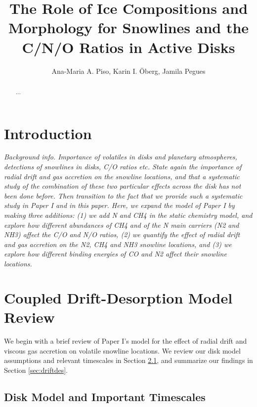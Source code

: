 \documentclass[apj]{emulateapj}
\newcommand{\emgr}[1]{\emph{ \color{gray} #1}}
\begin{document}


\title{The Role of Ice Compositions and Morphology for Snowlines and the C/N/O Ratios in Active Disks}

\author{Ana-Maria A. Piso, Karin I. \"Oberg, Jamila Pegues}


\begin{abstract}
...
\end{abstract}

\section{Introduction}

\emgr{Background info. Importance of volatiles in disks and planetary atmospheres, detections of snowlines in disks, C/O ratios etc. State again the importance of radial drift and gas accretion on the snowline locations, and that a systematic study of the combination of these two particular effects across the disk has not been done before. Then transition to the fact that we provide such a systematic study in Paper I and in this paper. Here, we expand the model of Paper I by making three additions: (1) we add N and CH4 in the static chemistry model, and explore how different abundances of CH4 and of the N main carriers (N2 and NH3) affect the C/O  and N/O ratios, (2) we quantify the effect of radial drift and gas accretion on the N2, CH4 and NH3 snowline locations, and (3) we explore how different binding energies of CO and N2 affect their snowline locations.}

\section{Coupled Drift-Desorption Model Review}

We begin with a brief review of Paper I's model for the effect of radial drift and viscous gas accretion on volatile snowline locations. We review our disk model assumptions and relevant timescales in Section \ref{sec:disktime}, and summarize our findings in Section \ref{sec:driftdes}.

\subsection{Disk Model and Important Timescales}
\label{sec:disktime}
\end{document}
